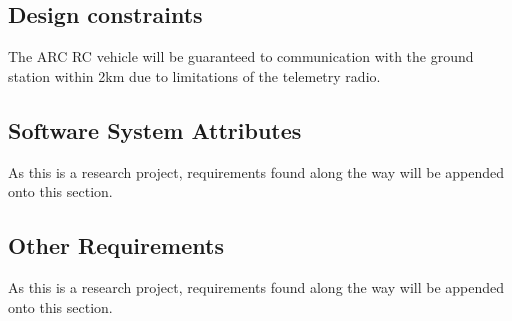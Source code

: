 \documentclass[compsoc,draftclsnofoot,onecolumn,10pt]{IEEEtran}
\begin{document}
\subsection{Design constraints}
The ARC RC vehicle will be guaranteed to communication with the ground station within 2km due to limitations of the telemetry radio.

\subsection{Software System Attributes}
As this is a research project, requirements found along the way will be appended onto this section. 

\subsection{Other Requirements}
As this is a research project, requirements found along the way will be appended onto this section. 



\end{document}
